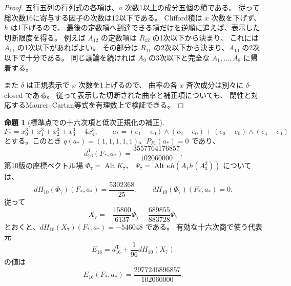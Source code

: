 \documentclass[a4paper,11pt]{ltjsarticle}
\theoremstyle{definition}
\newtheorem{proposition}[theorem]{命題}
\begin{document}
\begin{proof}
五行五列の行列式の各項は、$a$ 次数1以上の成分五個の積である。
従って総次数16に寄与する因子の次数は12以下である。
Clifford積は $x$ 次数を下げず、$h$ は1下げるので、
最後の定数項へ到達できる項だけを逆順に追えば、表示した切断限度を得る。
例えば $A_{12}$ の定数項は $R_{12}$ の1次以下から決まり、
これには $A_{11}$ の1次以下があればよい。
その部分は $R_{11}$ の2次以下から決まり、$A_{10}$ の2次以下で十分である。
同じ議論を続ければ $A_9$ の3次以下と完全な $A_1,\ldots,A_8$ に帰着する。

また $\delta$ は正規表示で $x$ 次数を1上げるので、
曲率の各 $x$ 斉次成分は別々に $\delta$-closed である。
従って表示した切断された曲率と補正項についても、
閉性と対応するMaurer--Cartan等式を有理数上で検証できる。
\end{proof}

\begin{proposition}[標準点での十六次項と低次正規化の補正]
\label{prop:v13-actual-sixteenth-values}
\[
 F_*=x_0^3+x_1^3+x_2^3+x_3^3-4x_4^3,\qquad
 a_*=(e_1-e_0)\wedge(e_2-e_0)
       +(e_3-e_0)\wedge(e_4-e_0)
\]
とする。このとき $q(a_*)=(1,1,1,1,1)$、$P_{F_*}(a_*)=0$ であり、
\[
 \boxed{\displaystyle
 d^{\mathrm T}_{16}(F_*,a_*)
 =\frac{3557764176857}{102060000}.}
\]
第10版の座標ベクトル場
$\Phi_7=\operatorname{Alt}K_7$、
$\Psi_7=\operatorname{Alt}\kappa h(A_1h(A_3^2))$ については、
\[
 dH_{10}(\Phi_7)(F_*,a_*)=\frac{5302368}{25},
 \qquad
 dH_{10}(\Psi_7)(F_*,a_*)=0.
\]
従って
\[
 X_7=-\frac{15800}{6137}\Phi_7
          -\frac{689855}{883728}\Psi_7
\]
とおくと、$dH_{10}(X_7)(F_*,a_*)=-546048$ である。
有効な十六次商で使う代表元
\[
 E_{16}=d^{\mathrm T}_{16}+\frac1{96}dH_{10}(X_7)
\]
の値は
\[
 \boxed{\displaystyle
 E_{16}(F_*,a_*)=\frac{2977246896857}{102060000}.}
\]
\end{proposition}
\end{document}
